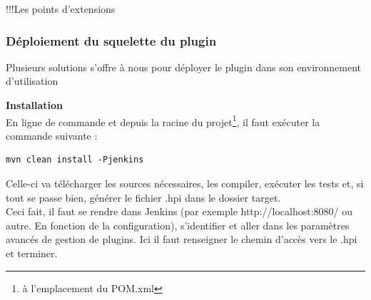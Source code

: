 !!!Les points d'extensions
\subsubsection{Déploiement du squelette du plugin}
Plusieurs solutions s'offre à nous pour déployer le plugin dans son environnement d'utilisation

\textbf{Installation }\hfill \\ \indent 
En ligne de commande et depuis la racine du projet\footnote{\`{a} l'emplacement du POM.xml}, il faut exécuter la commande suivante :
\begin{lstlisting}
mvn clean install -Pjenkins
\end{lstlisting}
Celle-ci va télécharger les sources nécessaires, les compiler, exécuter les tests et, si tout se passe bien, générer le fichier .hpi dans le dossier target.\\
Ceci fait, il faut se rendre dans Jenkins (par exemple http://localhost:8080/ ou autre. En fonction de la configuration), s'identifier et aller dans les paramètres avancés de gestion de plugins. Ici il faut renseigner le chemin d'accès vers le .hpi et terminer.\\


